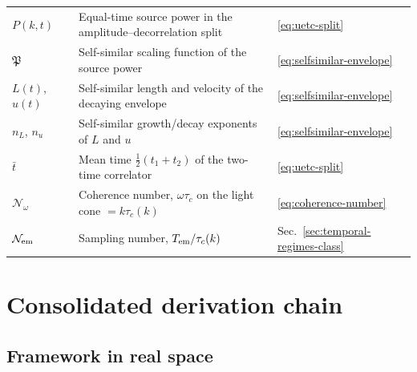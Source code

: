 \documentclass[10pt,prd,aps,nobibnotes,superscriptaddress,preprintnumbers,notitlepage]{revtex4-1}
\begin{document}
\begin{tabular}{@{}p{} p{} p{}@{}}
$P(k,t)$              & Equal-time source power in the amplitude--decorrelation split & \eqref{eq:uetc-split}\\
$\mathfrak{P}$        & Self-similar scaling function of the source power & \eqref{eq:selfsimilar-envelope}\\
$L(t)$, $u(t)$        & Self-similar length and velocity of the decaying envelope & \eqref{eq:selfsimilar-envelope}\\
$n_L$, $n_u$          & Self-similar growth/decay exponents of $L$ and $u$ & \eqref{eq:selfsimilar-envelope}\\
$\bar t$              & Mean time $\tfrac12(t_1+t_2)$ of the two-time correlator & \eqref{eq:uetc-split}\\
$\mathcal{N}_\omega$  & Coherence number, $\omega\tau_c$ on the light cone $=k\tau_c(k)$ & \eqref{eq:coherence-number}\\
$\mathcal{N}_{\rm em}$ & Sampling number, $T_{\rm em}/\tau_c(k)$ & Sec.~\ref{sec:temporal-regimes-class}\\
\hline\hline
\end{tabular}\par

\endgroup
\section{Consolidated derivation chain}
\label{sec:chain}

\subsection{Framework in real space}
\label{sec:chain-realspace}
\end{document}

